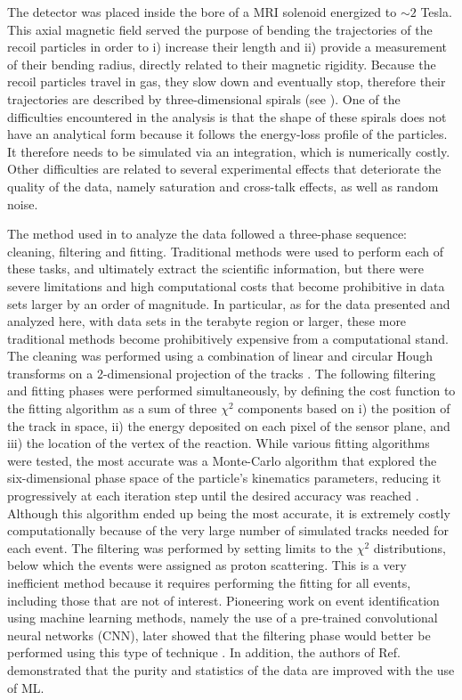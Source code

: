 \documentclass[review,number,sort&compress]{elsarticle}
\begin{document}
The detector was placed inside the bore of a MRI solenoid energized to $\sim 2$ Tesla. This axial magnetic field served the purpose of bending the trajectories of the recoil particles in order to i) increase their length and ii) provide a measurement of their bending radius, directly related to their magnetic rigidity. Because the recoil particles travel in gas, they slow down and eventually stop, therefore their trajectories are described by three-dimensional spirals (see \cite{Bradt2017}). One of the difficulties encountered in the analysis is that the shape of these spirals does not have an analytical form because it follows the energy-loss profile of the particles. It therefore needs to be simulated via an integration, which is numerically costly. Other difficulties are related to several experimental effects that deteriorate the quality of the data, namely saturation and cross-talk effects, as well as random noise. 

The method used in \cite{Bradt2018} to analyze the data followed a three-phase sequence: cleaning, filtering and fitting. Traditional methods were used to perform each of these tasks, and ultimately extract the scientific information, but there were severe limitations and high computational costs that become prohibitive in data sets larger by an order of magnitude.  In particular, as for the data presented and analyzed here, with data sets in the terabyte region or larger, these more traditional methods become prohibitively expensive from a computational stand.
The cleaning was performed using a combination of linear and circular Hough transforms on a 2-dimensional projection of the tracks \cite{Bradt2017}. The following filtering and fitting phases were performed simultaneously, by defining the cost function to the fitting algorithm as a sum of three $\chi^2$ components based on i) the position of the track in space, ii) the energy deposited on each pixel of the sensor plane, and iii) the location of the vertex of the reaction. While various fitting algorithms were tested, the most accurate was a Monte-Carlo algorithm that explored the six-dimensional phase space of the particle's kinematics parameters, reducing it progressively at each iteration step until the desired accuracy was reached \cite{Bradt2017}. Although this algorithm ended up being the most accurate, it is extremely costly computationally because of the very large number of simulated tracks needed for each event. The filtering was performed by setting limits to the $\chi^2$ distributions, below which the events were assigned as proton scattering. This is a very inefficient method because it requires performing the fitting for all events, including those that are not of interest. Pioneering work on event identification using machine learning methods, namely the use of a pre-trained convolutional neural networks (CNN), later showed that the filtering phase would better be performed using this type of technique \cite{Kuchera2019}. 
In addition, the authors of Ref.~\cite{Kuchera2019} demonstrated that the purity and statistics of the data are improved with the use of ML.
\end{document}
